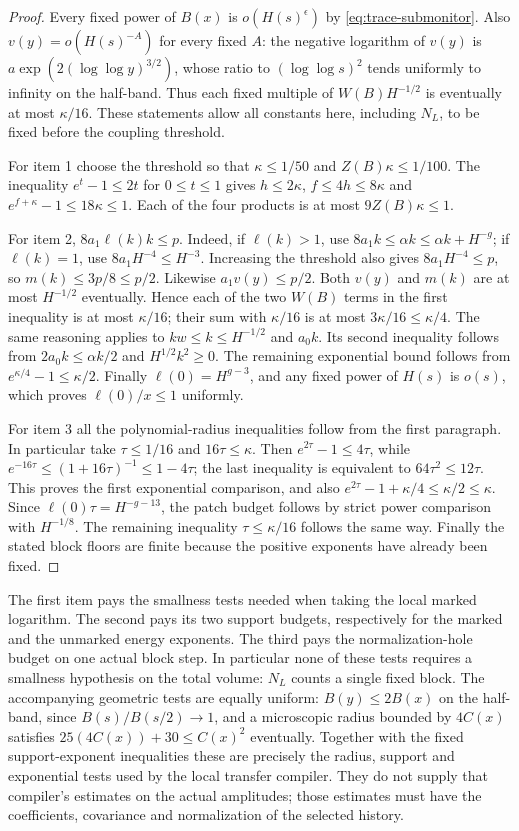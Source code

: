 \begin{proof}
Every fixed power of $B(x)$ is $o(H(s)^\epsilon)$ by
\eqref{eq:trace-submonitor}. Also $v(y)=o(H(s)^{-A})$ for every fixed
$A$: the negative logarithm of $v(y)$ is
$a\exp(2(\log\log y)^{3/2})$, whose ratio to $(\log\log s)^2$
tends uniformly to infinity on the half-band. Thus each fixed multiple
of $W(B)H^{-1/2}$ is eventually at most $\kappa/16$.
These statements allow all constants here, including $N_L$, to be
fixed before the coupling threshold.

For item 1 choose the threshold so that $\kappa\le1/50$ and
$Z(B)\kappa\le1/100$. The inequality $e^t-1\le2t$ for
$0\le t\le1$ gives $h\le2\kappa$, $f\le4h\le8\kappa$
and $e^{f+\kappa}-1\le18\kappa\le1$. Each of the four
products is at most $9Z(B)\kappa\le1$.

For item 2, $8a_1\ell(k)k\le p$. Indeed, if $\ell(k)>1$,
use $8a_1k\le\alpha k\le\alpha k+H^{-g}$; if $\ell(k)=1$,
use $8a_1H^{-4}\le H^{-3}$. Increasing the threshold also gives
$8a_1H^{-4}\le p$, so $m(k)\le3p/8\le p/2$.
Likewise $a_1v(y)\le p/2$. Both $v(y)$ and $m(k)$ are at most
$H^{-1/2}$ eventually. Hence each of the two $W(B)$ terms in the
first inequality is at most $\kappa/16$; their sum with
$\kappa/16$ is at most $3\kappa/16\le\kappa/4$.
The same reasoning applies to $kw\le k\le H^{-1/2}$ and $a_0k$.
Its second inequality follows from $2a_0k\le\alpha k/2$ and
$H^{1/2}k^2\ge0$. The remaining exponential bound follows from
$e^{\kappa/4}-1\le\kappa/2$. Finally
$\ell(0)=H^{g-3}$, and any fixed power of $H(s)$ is $o(s)$,
which proves $\ell(0)/x\le1$ uniformly.

For item 3 all the polynomial-radius inequalities follow from the
first paragraph. In particular take $\tau\le1/16$ and
$16\tau\le\kappa$. Then $e^{2\tau}-1\le4\tau$, while
$e^{-16\tau}\le(1+16\tau)^{-1}\le1-4\tau$; the last inequality
is equivalent to $64\tau^2\le12\tau$. This proves the first
exponential comparison, and also
$e^{2\tau}-1+\kappa/4\le\kappa/2\le\kappa$.
Since $\ell(0)\tau=H^{-g-13}$, the patch budget follows by strict
power comparison with $H^{-1/8}$. The remaining inequality
$\tau\le\kappa/16$ follows the same way. Finally the stated block
floors are finite because the positive exponents have already been fixed.
\end{proof}

The first item pays the smallness tests needed when taking the local
marked logarithm. The second pays its two support budgets, respectively
for the marked and the unmarked energy exponents. The third pays the
normalization-hole budget on one actual block step. In particular none
of these tests requires a smallness hypothesis on the total volume:
$N_L$ counts a single fixed block. The accompanying geometric tests
are equally uniform: $B(y)\le2B(x)$ on the half-band, since
$B(s)/B(s/2)\to1$, and a microscopic radius bounded by $4C(x)$
satisfies $25(4C(x))+30\le C(x)^2$ eventually. Together with the
fixed support-exponent inequalities these are precisely the radius,
support and exponential tests used by the local transfer compiler.
They do not supply that compiler's estimates on the actual amplitudes;
those estimates must have the coefficients, covariance and normalization
of the selected history.

